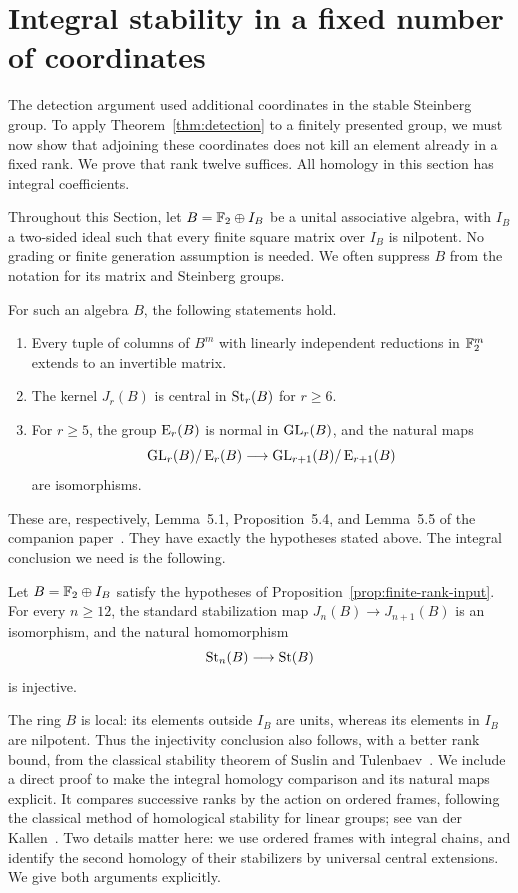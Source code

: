 \section{Integral stability in a fixed number of coordinates}
\label{sec:stability}

The detection argument used additional coordinates in the stable
Steinberg group. To apply Theorem~\ref{thm:detection} to a finitely
presented group, we must now show that adjoining these coordinates
does not kill an element already in a fixed rank. We prove that rank
twelve suffices. All homology in this section has integral coefficients.

Throughout this Section, let $B=\mathbb F_2\oplus I_B$ be a unital associative
algebra, with $I_B$ a two-sided ideal such that every finite square
matrix over $I_B$ is nilpotent. No grading or finite generation
assumption is needed. We often suppress $B$ from the notation for its
matrix and Steinberg groups.

\begin{proposition}\label{prop:finite-rank-input}
For such an algebra $B$, the following statements hold.
\begin{enumerate}[label=\textup{(\roman*)}]
\item Every tuple of columns of $B^m$ with linearly independent
reductions in $\mathbb F_2^m$ extends to an invertible matrix.
\item The kernel $J_r(B)$ is central in $\operatorname{St}_r(B)$ for $r\geq6$.
\item For $r\geq5$, the group $\operatorname{E}_r(B)$ is normal in $\operatorname{GL}_r(B)$,
and the natural maps
\[
 \operatorname{GL}_r(B)/\operatorname{E}_r(B)\longrightarrow
 \operatorname{GL}_{r+1}(B)/\operatorname{E}_{r+1}(B)
\]
are isomorphisms.
\end{enumerate}
\end{proposition}

These are, respectively, Lemma~5.1, Proposition~5.4, and Lemma~5.5
of the companion paper~\cite{Companion}. They have exactly the
hypotheses stated above. The integral conclusion we need is the
following.

\begin{theorem}\label{thm:stability}
Let $B=\mathbb F_2\oplus I_B$ satisfy the hypotheses of
Proposition~\ref{prop:finite-rank-input}. For every $n\geq12$, the
standard stabilization map $J_n(B)\to J_{n+1}(B)$ is an isomorphism,
and the natural homomorphism
\[
 \operatorname{St}_n(B)\longrightarrow\operatorname{St}(B)
\]
is injective.
\end{theorem}

The ring $B$ is local: its elements outside $I_B$ are units, whereas
its elements in $I_B$ are nilpotent. Thus the injectivity conclusion
also follows, with a better rank bound, from the classical stability
theorem of Suslin and Tulenbaev~\cite[Theorem~4.1]{SuslinTulenbaev1976}.
We include a direct proof to make the integral homology comparison
and its natural maps explicit. It compares successive ranks by the
action on ordered frames, following the classical method of
homological stability for linear groups; see
van der Kallen~\cite{vanderKallen1980}.
Two details matter here: we use ordered frames with integral chains,
and identify the second homology of their stabilizers by universal
central extensions. We give both arguments explicitly.

